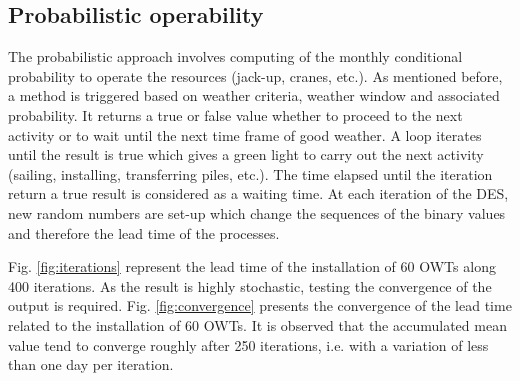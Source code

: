 \subsection{Probabilistic operability}
The probabilistic approach involves computing of the monthly conditional probability to operate the resources (jack-up, cranes, etc.). As mentioned before, a method is triggered based on weather criteria, weather window and associated probability. It returns a true or false value whether to proceed to the next activity or to wait until the next time frame of good weather. A loop iterates until the result is true which gives a green light to carry out the next activity (sailing, installing, transferring piles, etc.). The time elapsed until the iteration return a true result is considered as a waiting time. At each iteration of the DES, new random numbers are set-up which change the sequences of the binary values and therefore the lead time of the processes.

Fig. \ref{fig:iterations} represent the lead time of the installation of 60 OWTs along 400 iterations. As the result is highly stochastic, testing the convergence of the output is required. Fig. \ref{fig:convergence} presents the convergence of the lead time related to the installation of 60 OWTs. It is observed that the accumulated mean value tend to converge roughly after 250 iterations, i.e. with a variation of less than one day per iteration.


